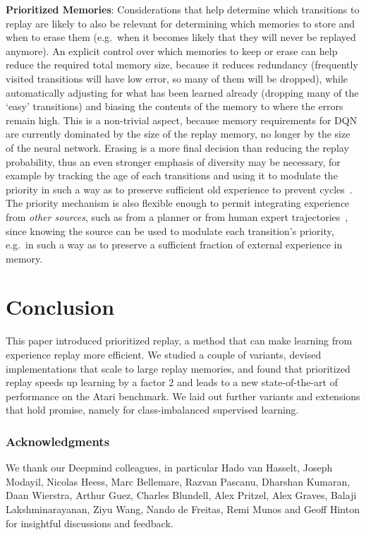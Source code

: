 \documentclass[a4paper]{article}
\begin{document}
{\bf Prioritized Memories}:
Considerations that help determine which transitions to replay are likely to also be relevant 
for determining which memories to store and when to erase them (e.g.\ when it becomes likely that
they will never be replayed anymore).
An explicit control over which memories to keep or erase 
can help reduce the required total memory size, because it reduces redundancy (frequently visited transitions will 
have low error, so many of them will be dropped), while automatically
adjusting for what has been learned already (dropping many of the `easy' transitions) 
and biasing the contents of the memory to where the errors remain high.
This is a non-trivial aspect, because memory requirements for DQN 
are currently dominated by the size of the replay memory, no longer by the size of the neural network.
Erasing is a more final decision than reducing the replay probability, 
thus an even stronger emphasis of diversity may be necessary,
for example by tracking the age of each transitions and using it to modulate the priority 
in such a way as to preserve sufficient old experience to prevent cycles~\citep[related to `hall of fame' ideas in multi-agent literature,][]{hall-of-fame}.
The priority mechanism is also flexible enough to permit integrating experience from
\emph{other sources}, such as from a planner or from human expert trajectories~\citep{dagger}, 
since knowing the source can be used to modulate each transition's priority, 
e.g.~in such a way as to preserve a sufficient fraction of external experience in memory.









\section{Conclusion}
This paper introduced prioritized replay, a method that can make
learning from experience replay more efficient.
We studied a couple of variants, devised implementations that scale to large 
replay memories, and found that prioritized replay speeds up learning by a factor 2
and leads to a new state-of-the-art of performance on the Atari benchmark.
We laid out further variants and extensions that hold promise, 
namely for class-imbalanced supervised learning.


\subsubsection*{Acknowledgments}
We thank our Deepmind colleagues, 
in particular Hado van Hasselt, Joseph Modayil, Nicolas Heess, Marc Bellemare, Razvan Pascanu, Dharshan Kumaran, Daan Wierstra, Arthur Guez, Charles Blundell, Alex Pritzel, Alex Graves, Balaji Lakshminarayanan, Ziyu Wang, Nando de Freitas, Remi Munos and Geoff Hinton for insightful discussions and feedback.
\end{document}
